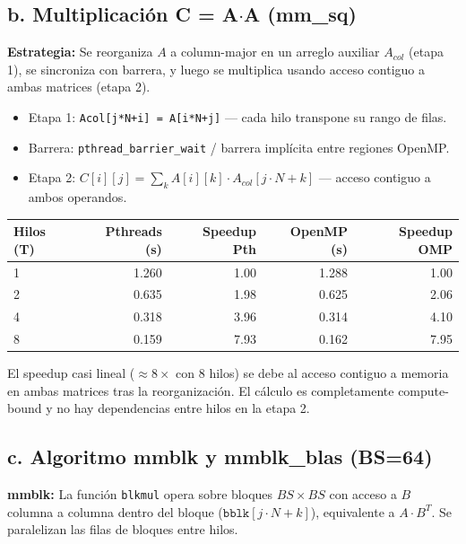 \documentclass[11pt,a4paper]{article}
\begin{document}
\subsection*{b. Multiplicación C = A$\cdot$A (mm\_sq)}

\textbf{Estrategia:} Se reorganiza $A$ a column-major en un arreglo auxiliar $A_{col}$ (etapa 1), se sincroniza con barrera, y luego se multiplica usando acceso contiguo a ambas matrices (etapa 2).

\begin{itemize}
    \item Etapa 1: \texttt{Acol[j*N+i] = A[i*N+j]} — cada hilo transpone su rango de filas.
    \item Barrera: \texttt{pthread\_barrier\_wait} / barrera implícita entre regiones OpenMP.
    \item Etapa 2: $C[i][j] = \sum_k A[i][k] \cdot A_{col}[j \cdot N + k]$ — acceso contiguo a ambos operandos.
\end{itemize}

\begin{center}
\begin{tabular}{|l|r|r|r|r|}
\hline
\textbf{Hilos (T)} & \textbf{Pthreads (s)} & \textbf{Speedup Pth} & \textbf{OpenMP (s)} & \textbf{Speedup OMP} \\
\hline
1 & 1.260 & 1.00 & 1.288 & 1.00 \\
2 & 0.635 & 1.98 & 0.625 & 2.06 \\
4 & 0.318 & 3.96 & 0.314 & 4.10 \\
8 & 0.159 & 7.93 & 0.162 & 7.95 \\
\hline
\end{tabular}
\end{center}

El speedup casi lineal ($\approx 8\times$ con 8 hilos) se debe al acceso contiguo a memoria en ambas matrices tras la reorganización. El cálculo es completamente compute-bound y no hay dependencias entre hilos en la etapa 2.

\subsection*{c. Algoritmo mmblk y mmblk\_blas (BS=64)}

\textbf{mmblk:} La función \texttt{blkmul} opera sobre bloques $BS \times BS$ con acceso a $B$ columna a columna dentro del bloque ($\texttt{bblk}[j \cdot N + k]$), equivalente a $A \cdot B^T$. Se paralelizan las filas de bloques entre hilos.
\end{document}
